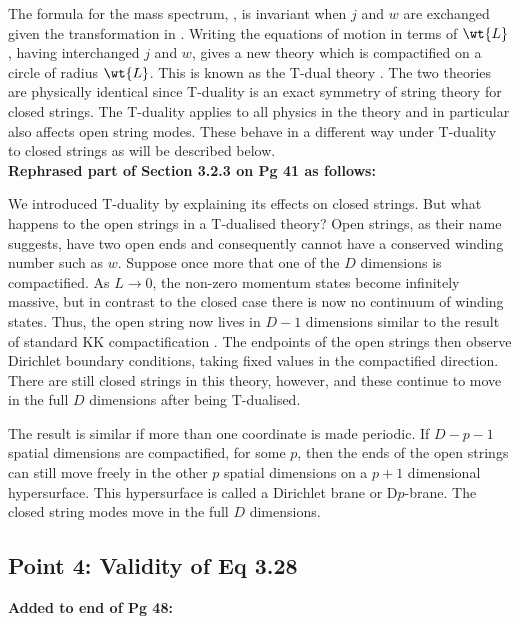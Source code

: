 The formula for the mass spectrum, , is invariant
when $j$ and $w$ are exchanged given the transformation in .
Writing the equations of motion in terms of $\wt{L}$, having interchanged $j$ and
$w$, gives a new theory which is compactified on a circle of radius $\wt{L}$. This is known as the
T-dual theory \cite{Sakai1986,Kikkawa1984b}. The two
theories are physically identical since T-duality is an exact symmetry
of string theory for closed strings. The T-duality applies to all physics in the theory and in
particular also affects open string modes. These behave in a different way under T-duality to closed
strings as will be described below.
\\

\textbf{Rephrased part of Section 3.2.3 on Pg 41 as follows:}

We introduced T-duality by explaining
its effects on closed strings. But what happens to the open strings in a T-dualised theory? Open
strings, as their name suggests, have two open ends and
consequently cannot have a conserved winding number such as $w$. Suppose once more
that one
of the $D$ dimensions is compactified. As $L\rightarrow0$, the non-zero momentum
states become infinitely massive, but in contrast to the closed case there is now
no continuum of winding states. Thus, the open string now lives in $D-1$ dimensions
similar to the result of standard KK compactification \cite{Johnson2000}.
The endpoints of the open strings 
then observe Dirichlet boundary conditions, taking fixed values in the compactified
direction.
There are still closed strings in this theory, however, and these continue to
move in the full $D$ dimensions after being T-dualised.  

The result is similar if more than
one coordinate is made periodic.
If $D-p-1$ spatial dimensions are compactified, for some $p$, then the ends of
the open
strings can still move freely in the other $p$ spatial dimensions on a $p+1$
dimensional hypersurface. This hypersurface is called a Dirichlet brane or
D$p$-brane. The closed string modes move in the full $D$ dimensions.



\subsection{Point 4: Validity of Eq 3.28}
\textbf{Added to end of Pg 48:}

